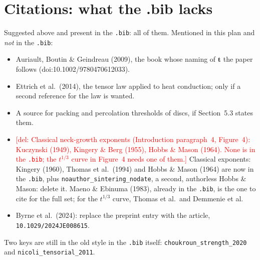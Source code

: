 \documentclass[11pt]{article}
\newcommand{\add}[1]{\textcolor{revA}{#1}}
\newcommand{\del}[1]{\textcolor{red}{[del: #1]}}
\begin{document}
\section*{Citations: what the .bib lacks}
Suggested above and present in the \texttt{.bib}: all of them. Mentioned in
this plan and \emph{not} in the \texttt{.bib}:
\begin{itemize}
\item Auriault, Boutin \& Geindreau (2009), the book whose naming of
  $\mathbf{t}$ the paper follows (doi:10.1002/9780470612033).
\item Ettrich et al.\ (2014), the tensor law applied to heat conduction;
  only if a second reference for the law is wanted.
\item A source for packing and percolation thresholds of discs, if
  Section~5.3 states them.
\item \del{Classical neck-growth exponents (Introduction paragraph~4,
  Figure~4): Kuczynski (1949), Kingery \& Berg (1955), Hobbs \& Mason
  (1964). None is in the \texttt{.bib}; the $t^{1/3}$ curve in Figure~4
  needs one of them.}
  \add{Classical exponents: Kingery (1960), Thomas et al.\ (1994) and Hobbs \& Mason (1964) are now in the \texttt{.bib}, plus \texttt{noauthor\_sintering\_nodate}, a second, authorless Hobbs \& Mason: delete it. Maeno \& Ebinuma (1983), already in the \texttt{.bib}, is the one to cite for the full set; for the $t^{1/3}$ curve, Thomas et al.\ and Demmenie et al.}
\item \add{Byrne et al.\ (2024): replace the preprint entry with the article, \texttt{10.1029/2024JE008615}.}
\end{itemize}
Two keys are still in the old style in the \texttt{.bib} itself:
\texttt{choukroun\_strength\_2020} and \texttt{nicoli\_tensorial\_2011}.
\end{document}
